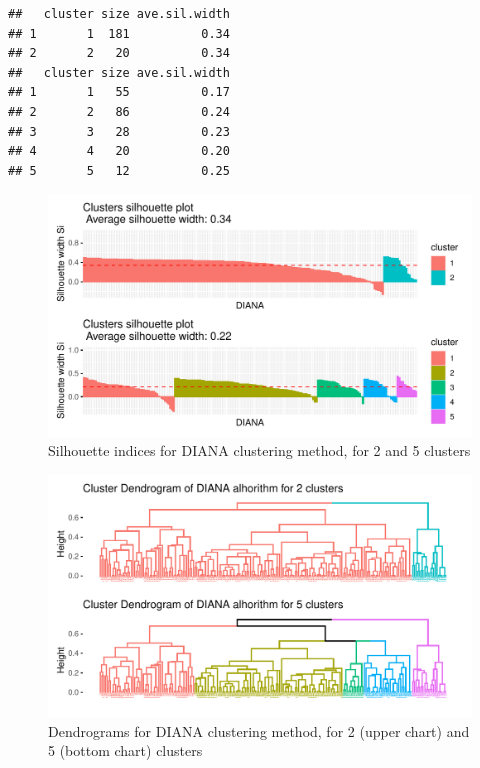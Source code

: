 \documentclass[11pt,a4paper]{article}\usepackage[]{graphicx}\usepackage[]{xcolor}
\makeatletter
\def\maxwidth{ %
  \ifdim\Gin@nat@width>\linewidth
    \linewidth
  \else
    \Gin@nat@width
  \fi
}
\newenvironment{kframe}{%
 \def\at@end@of@kframe{}%
 \ifinner\ifhmode%
  \def\at@end@of@kframe{\end{minipage}}%
  \begin{minipage}{\columnwidth}%
 \fi\fi%
 \def\FrameCommand##1{\hskip\@totalleftmargin \hskip-\fboxsep
 \colorbox{shadecolor}{##1}\hskip-\fboxsep
     \hskip-\linewidth \hskip-\@totalleftmargin \hskip\columnwidth}%
 \MakeFramed {\advance\hsize-\width
   \@totalleftmargin\z@ \linewidth\hsize
   \@setminipage}}%
 {\par\unskip\endMakeFramed%
 \at@end@of@kframe}
\newenvironment{knitrout}{}{} %
\makeatother
\begin{document}
\begin{knitrout}
\color{fgcolor}\begin{kframe}
\begin{verbatim}
##   cluster size ave.sil.width
## 1       1  181          0.34
## 2       2   20          0.34
##   cluster size ave.sil.width
## 1       1   55          0.17
## 2       2   86          0.24
## 3       3   28          0.23
## 4       4   20          0.20
## 5       5   12          0.25
\end{verbatim}
\end{kframe}\begin{figure}
\includegraphics[width=\maxwidth]{figure/silhouette_diana25-1} \caption[Silhouette indices for DIANA clustering method, for 2 and 5 clusters]{Silhouette indices for DIANA clustering method, for 2 and 5 clusters}\label{fig:silhouette_diana25}
\end{figure}

\end{knitrout}
	
\begin{knitrout}
\color{fgcolor}\begin{figure}
\includegraphics[width=\maxwidth]{figure/dendrograms_diana-1} \caption[Dendrograms for DIANA clustering method, for 2 (upper chart) and 5 (bottom chart) clusters]{Dendrograms for DIANA clustering method, for 2 (upper chart) and 5 (bottom chart) clusters}\label{fig:dendrograms_diana}
\end{figure}

\end{knitrout}
	
\end{document}
